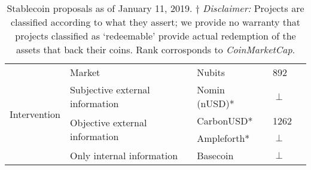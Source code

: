 \begin{table}[t]
\begin{tabular}{|l|l|l|l|l|}
                                                                                                                 
\multirow{5}{*}{Intervention}                                                           
						& \multirow{1}{*}{Market} 										& Nubits & 892 \\ \cline{2-4}
						& \multirow{1}{*}{Subjective external information}  		& Nomin (nUSD)* & $\perp$  \\ \cline{2-4}
						& \multirow{2}{*}{Objective external information}  		& CarbonUSD* & 1262 \\ \cline{3-4}
						&														& Ampleforth* & $\perp$ \\ \cline{2-4}
						& \multirow{1}{*}{Only internal information} 			& Basecoin & $\perp$ \\ \hline

\end{tabular}
\caption{Stablecoin proposals as of January 11, 2019. $\dagger$ \textit{Disclaimer:} Projects are classified according to what they assert; \eg we provide no warranty that projects classified as `redeemable' provide actual redemption of the assets that back their coins. Rank corrosponds to \textit{CoinMarketCap}.\label{tab:stablecoins}}
\end{table}
